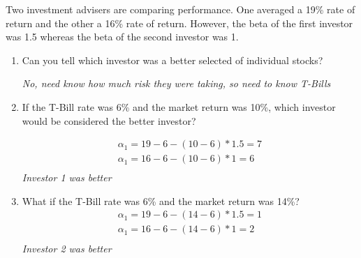 \documentclass[11pt]{article}
\theoremstyle{definition}
\begin{document}
    \begin{shaded}
    Two investment advisers are comparing performance.   One averaged a 19\% rate of return and the other a 16\% rate of return.   However, the beta of the first investor was 1.5 whereas the beta of the second investor was 1.
    \begin{enumerate}
        \item Can you tell which investor was a better selected of individual stocks?

        \textit{No, need know how much risk they were taking, so need to know T-Bills}
        
        \item If the T-Bill rate was 6\% and the market return was 10\%, which investor would be considered the better investor?

        \begin{align*}
            \alpha_1 = 19-6 - (10-6)*1.5 = 7\\
            \alpha_1 = 16-6 - (10-6)*1 = 6\\
        \end{align*}
        \textit{Investor 1 was better}
        
        \item What if the T-Bill rate was 6\% and the market return was 14\%?
       \begin{align*}
            \alpha_1 = 19-6 - (14-6)*1.5 = 1\\
            \alpha_1 = 16-6 - (14-6)*1 = 2\\
        \end{align*}
        \textit{Investor 2 was better}
        
    \end{enumerate}
    
    \end{shaded}
\end{document}
